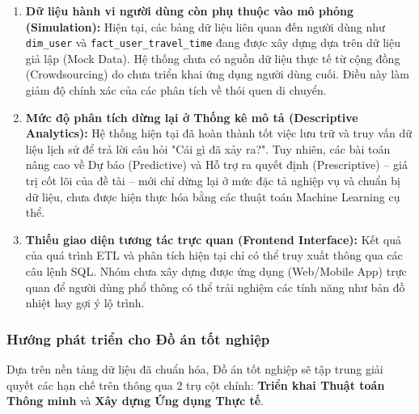 \begin{enumerate}
    \item \textbf{Dữ liệu hành vi người dùng còn phụ thuộc vào mô phỏng (Simulation):} Hiện tại, các bảng dữ liệu liên quan đến người dùng như \texttt{dim\_user} và \texttt{fact\_user\_travel\_time} đang được xây dựng dựa trên dữ liệu giả lập (Mock Data). Hệ thống chưa có nguồn dữ liệu thực tế từ cộng đồng (Crowdsourcing) do chưa triển khai ứng dụng người dùng cuối. Điều này làm giảm độ chính xác của các phân tích về thói quen di chuyển.
    
    \item \textbf{Mức độ phân tích dừng lại ở Thống kê mô tả (Descriptive Analytics):} Hệ thống hiện tại đã hoàn thành tốt việc lưu trữ và truy vấn dữ liệu lịch sử để trả lời câu hỏi "Cái gì đã xảy ra?". Tuy nhiên, các bài toán nâng cao về Dự báo (Predictive) và Hỗ trợ ra quyết định (Prescriptive) – giá trị cốt lõi của đề tài – mới chỉ dừng lại ở mức đặc tả nghiệp vụ và chuẩn bị dữ liệu, chưa được hiện thực hóa bằng các thuật toán Machine Learning cụ thể.
    
    \item \textbf{Thiếu giao diện tương tác trực quan (Frontend Interface):} Kết quả của quá trình ETL và phân tích hiện tại chỉ có thể truy xuất thông qua các câu lệnh SQL. Nhóm chưa xây dựng được ứng dụng (Web/Mobile App) trực quan để người dùng phổ thông có thể trải nghiệm các tính năng như bản đồ nhiệt hay gợi ý lộ trình.
\end{enumerate}

\subsubsection{Hướng phát triển cho Đồ án tốt nghiệp}
Dựa trên nền tảng dữ liệu đã chuẩn hóa, Đồ án tốt nghiệp sẽ tập trung giải quyết các hạn chế trên thông qua 2 trụ cột chính: \textbf{Triển khai Thuật toán Thông minh} và \textbf{Xây dựng Ứng dụng Thực tế}.

